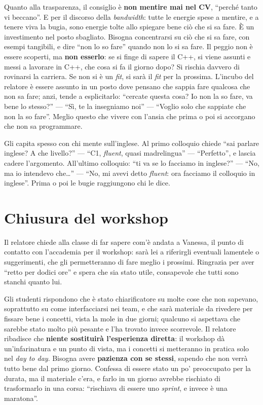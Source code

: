 Quanto alla trasparenza, il consiglio è \textbf{non mentire mai nel CV}, ``perché tanto vi beccano''. E per il discorso della
\emph{bandwidth}: tutte le energie spese a mentire, e a tenere viva la bugia, sono energie tolte allo spiegare bene ciò che
si sa fare. È un investimento nel posto sbagliato. Bisogna concentrarsi su ciò che si sa fare, con esempi tangibili, e dire
``non lo so fare'' quando non lo si sa fare. Il peggio non è essere scoperti, ma \textbf{non esserlo}: se si finge di sapere
il C++, si viene assunti e messi a lavorare in C++, che cosa si fa il giorno dopo? Si rischia davvero di rovinarsi la
carriera. Se non si è un \emph{fit}, si sarà il \emph{fit} per la prossima. L'incubo del relatore è essere assunto in un
posto dove pensano che sappia fare qualcosa che non sa fare; anzi, tende a esplicitarlo: ``cercate questa cosa? Io non la so
fare, va bene lo stesso?'' --- ``Sì, te la insegniamo noi'' --- ``Voglio solo che sappiate che non la so fare''. Meglio
questo che vivere con l'ansia che prima o poi si accorgano che non sa programmare.

Gli capita spesso con chi mente sull'inglese. Al primo colloquio chiede ``sai parlare inglese? A che livello?'' --- ``C1,
\emph{fluent}, quasi madrelingua'' --- ``Perfetto'', e lascia cadere l'argomento. All'ultimo colloquio: ``ti va se lo facciamo
in inglese?'' --- ``No, ma io intendevo che\dots'' --- ``No, mi avevi detto \emph{fluent}: ora facciamo il colloquio in
inglese''. Prima o poi le bugie raggiungono chi le dice.

\section{Chiusura del workshop}
\label{sec:z2-chiusura}

Il relatore chiede alla classe di far sapere com'è andata a Vanessa, il punto di contatto con l'accademia per il workshop:
sarà lei a riferirgli eventuali lamentele o suggerimenti, che gli permetteranno di fare meglio i prossimi. Ringrazia per aver
``retto per dodici ore'' e spera che sia stato utile, consapevole che tutti sono stanchi quanto lui.

Gli studenti rispondono che è stato chiarificatore su molte cose che non sapevano, soprattutto su come interfacciarsi nei
team, e che sarà materiale da rivedere per fissare bene i concetti, vista la mole in due giorni; qualcuno si aspettava che
sarebbe stato molto più pesante e l'ha trovato invece scorrevole. Il relatore ribadisce che \textbf{niente sostituirà
l'esperienza diretta}: il workshop dà un'infarinatura e un punto di vista, ma i concetti si metteranno in pratica solo nel
\emph{day to day}. Bisogna avere \textbf{pazienza con se stessi}, sapendo che non verrà tutto bene dal primo giorno.
Confessa di essere stato un po' preoccupato per la durata, ma il materiale c'era, e farlo in un giorno avrebbe rischiato di
trasformarlo in una corsa: ``rischiava di essere uno \emph{sprint}, e invece è una maratona''.


